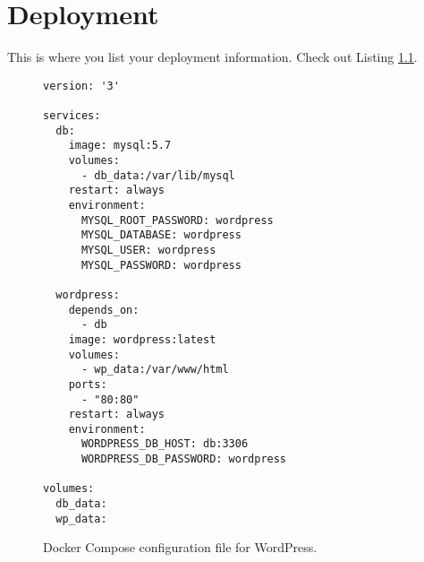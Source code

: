 \chapter{Deployment}
\label{chapter:deployment}

This is where you list your deployment information.
Check out Listing \ref{listing:docker-compose}.

\begin{figure}[htp]
  \begin{verbatim}
version: '3'

services:
  db:
    image: mysql:5.7
    volumes:
      - db_data:/var/lib/mysql
    restart: always
    environment:
      MYSQL_ROOT_PASSWORD: wordpress
      MYSQL_DATABASE: wordpress
      MYSQL_USER: wordpress
      MYSQL_PASSWORD: wordpress

  wordpress:
    depends_on:
      - db
    image: wordpress:latest
    volumes:
      - wp_data:/var/www/html
    ports:
      - "80:80"
    restart: always
    environment:
      WORDPRESS_DB_HOST: db:3306
      WORDPRESS_DB_PASSWORD: wordpress

volumes:
  db_data:
  wp_data:
  \end{verbatim}
  \caption{Docker Compose configuration file for WordPress.}
  \label{listing:docker-compose}
\end{figure}
